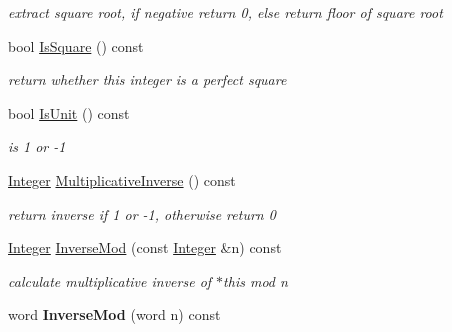 \begin{DoxyCompactItemize}
\begin{DoxyCompactList}\small\item\em extract square root, if negative return 0, else return floor of square root \item\end{DoxyCompactList}\item 
\hypertarget{class_integer_a49efda9b0c4767508a2b5541380132ed}{
bool \hyperlink{class_integer_a49efda9b0c4767508a2b5541380132ed}{IsSquare} () const }
\label{class_integer_a49efda9b0c4767508a2b5541380132ed}

\begin{DoxyCompactList}\small\item\em return whether this integer is a perfect square \item\end{DoxyCompactList}\item 
\hypertarget{class_integer_acbee0ebe94c7ef5b0da39beabe87c27b}{
bool \hyperlink{class_integer_acbee0ebe94c7ef5b0da39beabe87c27b}{IsUnit} () const }
\label{class_integer_acbee0ebe94c7ef5b0da39beabe87c27b}

\begin{DoxyCompactList}\small\item\em is 1 or -\/1 \item\end{DoxyCompactList}\item 
\hypertarget{class_integer_a94954b3df8073387d225be1033b0fa5b}{
\hyperlink{class_integer}{Integer} \hyperlink{class_integer_a94954b3df8073387d225be1033b0fa5b}{MultiplicativeInverse} () const }
\label{class_integer_a94954b3df8073387d225be1033b0fa5b}

\begin{DoxyCompactList}\small\item\em return inverse if 1 or -\/1, otherwise return 0 \item\end{DoxyCompactList}\item 
\hypertarget{class_integer_a881f9c714ee42f35718725a43d4d7db3}{
\hyperlink{class_integer}{Integer} \hyperlink{class_integer_a881f9c714ee42f35718725a43d4d7db3}{InverseMod} (const \hyperlink{class_integer}{Integer} \&n) const }
\label{class_integer_a881f9c714ee42f35718725a43d4d7db3}

\begin{DoxyCompactList}\small\item\em calculate multiplicative inverse of $\ast$this mod n \item\end{DoxyCompactList}\item 
\hypertarget{class_integer_a3f73939559a765be0b1c9a9681ad9e2c}{
word {\bfseries InverseMod} (word n) const }
\label{class_integer_a3f73939559a765be0b1c9a9681ad9e2c}


\end{DoxyCompactItemize}
